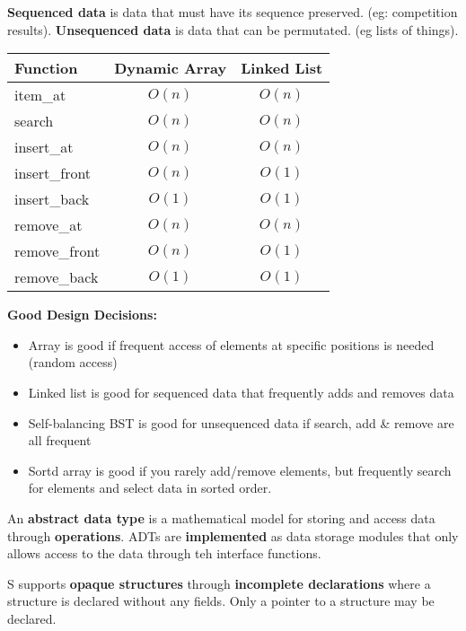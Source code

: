 \documentclass[english, 12pt]{article}
\begin{document}
\begin{defn}
\textbf{Sequenced data} is data that must have its sequence preserved. (eg: competition results). \textbf{Unsequenced data} is data that can be permutated. (eg lists of things).
\end{defn}

\begin{tabular}{|l|c|c|}
\hline
Function & Dynamic Array & Linked List \\
\hline
item\_at & $O(n)$ & $O(n)$ \\
search & $O(n)$ & $O(n)$ \\
insert\_at & $O(n)$ & $O(n)$ \\
insert\_front & $O(n)$ & $O(1)$ \\
insert\_back & $O(1)$ & $O(1)$ \\
remove\_at & $O(n)$ & $O(n)$ \\
remove\_front & $O(n)$ & $O(1)$ \\
remove\_back & $O(1)$ & $O(1)$ \\
\hline
\end{tabular}
\begin{exmp}
\textbf{Good Design Decisions:}
\begin{itemize}
\item Array is good if frequent access of elements at specific positions is needed (random access)
\item Linked list is good for sequenced data that frequently adds and removes data
\item Self-balancing BST is good for unsequenced data if search, add \& remove are all frequent
\item Sortd array is good if you rarely add/remove elements, but frequently search for elements and select data in sorted order.
\end{itemize}
\end{exmp}

\begin{defn}
An \textbf{abstract data type} is a mathematical model for storing and access data through \textbf{operations}. ADTs are \textbf{implemented} as data storage modules that only allows access to the data through teh interface functions.
\end{defn}

\begin{defn}
S supports \textbf{opaque structures} through \textbf{incomplete declarations} where a structure is declared without any fields. Only a pointer to a structure may be declared.
\end{defn}
\end{document}
